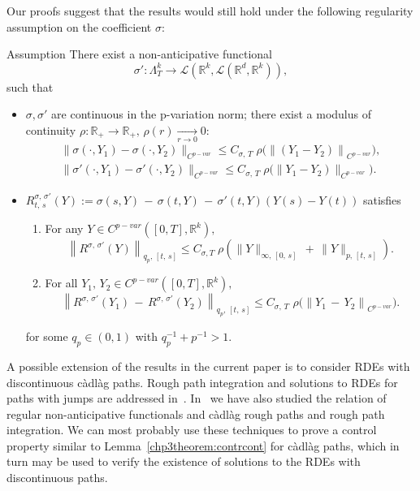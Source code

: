 \documentclass[AHL,Unicode,longabstracts,published]{cedram}
\newcommand{\cadlag}{càdlàg }
\newcommand{\calL}{\mathcal{L}}
\newcommand{\Rr}{{\mathbb{R}}}
\newcommand*{\alphenumi}{\renewcommand*{\theenumi}{\alph{enumi}}}
\begin{document}
\begin{rema}
Our proofs suggest that the results would still hold under the following regularity assumption on the coefficient $\sigma$:
\end{rema}

\begin{enonce}{Assumption}
There exist a non-anticipative functional
\[
\sigma'\colon\Lambda^k_T\to \calL\left(\Rr^k,\calL\left(\Rr^d,\Rr^k\right)\right),
\]
such that
\begin{itemize}
\item $\sigma, \sigma'$ are continuous in the p-variation norm; there exist a modulus of continuity $\rho\colon \Rr_+\to \Rr_+,\, \rho(r)\xrightarrow[r\to 0]{} 0$:
\begin{align*}
\big\|\sigma\left(\cdot, Y_1\right)-\sigma\left(\cdot, Y_2\right)\big\|_{{C}^{p-var}}\leq C_{\sigma,\,T}\;\rho \big(\left\|\left(Y_1- Y_2\right)\right\|_{{C}^{p-var}}\big),\\
\big\|\sigma'\left(\cdot, Y_1\right)-\sigma'\left(\cdot, Y_2\right)\big\|_{{C}^{p-var}}\leq C_{\sigma,\,T}\;\rho \big(\left\| Y_1- Y_2\right)\|_{{C}^{p-var}} \big).
\end{align*}

\item $R^{\sigma,\,\sigma'}_{t,\,s}(Y):=\sigma(s, Y)\,-\,\sigma(t, Y)\,-\,\sigma'(t,Y)(Y(s)-Y(t))$ satisfies
\begin{enumerate}\alphenumi
\item For any $Y\in C^{p-var}([0,T], \Rr^k),$
\[
\left\|R^{\sigma,\,\sigma'}(Y)\right\|_{q_p,\,[t,\,s]}\leq C_{\sigma, T}\; \rho\left(\|Y\|_{\infty,\,[0,\,s]}\,+\,\|Y\|_{p,\,[t,\,s]}\right).
\]

\item For all $Y_1,\, Y_2\in C^{p-var}([0,T], \Rr^k),$
\[
\left\|R^{\sigma,\,\sigma'}(Y_1)\,-\,R^{\sigma, \,\sigma'}(Y_2)\right\|_{q_p,\,[t,\,s]}\leq C_{\sigma,\,T}\,\, \rho\big(\left\|Y_1\,-\,Y_2\right\|_{{C}^{p-var}}\big).
\]
\end{enumerate}
for some $q_{p}\in (0,1)$ with $q_{p}^{-1}+p^{-1}>1$.
\end{itemize}
\end{enonce}


\begin{rema}
A possible extension of the results in the current paper is to consider RDEs with discontinuous \cadlag paths. Rough path integration and solutions to RDEs for paths with jumps are addressed in~\cite{FritzShekhar,FrizZhang}. In~\cite{Anna} we have also studied the relation of regular non-anticipative functionals and \cadlag rough paths and rough path integration. We can most probably use these techniques to prove a control property similar to Lemma~\ref{chp3theorem:contrcont} for \cadlag paths, which in turn may be used to verify the existence of solutions to the RDEs with discontinuous paths.
\end{rema}
\end{document}
